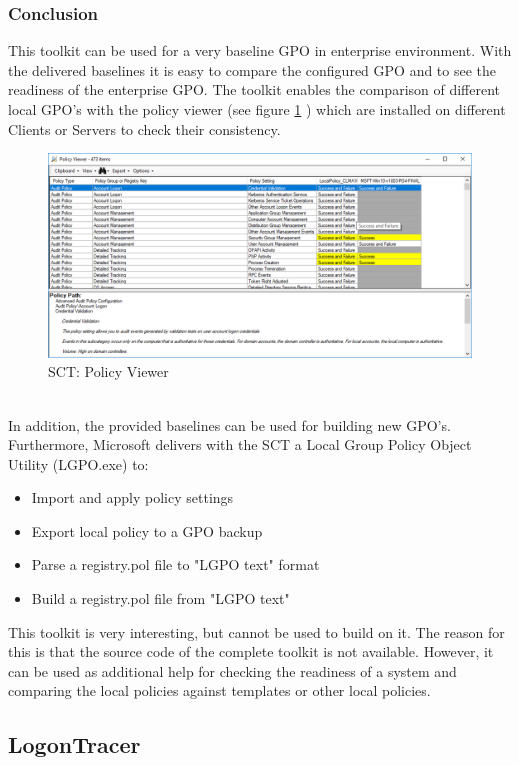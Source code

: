 \subsubsection{Conclusion}
This toolkit can be used for a very baseline GPO in enterprise environment. With the delivered baselines it is easy to compare the configured GPO and to see the readiness of the enterprise GPO. The toolkit enables the comparison of different local GPO's with the policy viewer (see figure \ref{fig:policy_viewer} ) which are installed on different Clients or Servers to check their consistency. 
\begin{figure}[H]
    \centering
    \includegraphics[width=1\linewidth]{assets/SCT/policy_viewer.png}
    \caption{SCT: Policy Viewer}\label{fig:policy_viewer}
\end{figure} \ \\
In addition, the provided baselines can be used for building new GPO's. Furthermore, Microsoft delivers with the SCT a Local Group Policy Object Utility (LGPO.exe) to:
\begin{itemize}
    \item Import and apply policy settings
    \item Export local policy to a GPO backup
    \item Parse a registry.pol file to "LGPO text" format
    \item Build a registry.pol file from "LGPO text"
\end{itemize}
This toolkit is very interesting, but cannot be used to build on it. The reason for this is that the source code of the complete toolkit is not available. However, it can be used as additional help for checking the readiness of a system and comparing the local policies against templates or other local policies.

\clearpage

\subsection{LogonTracer}

